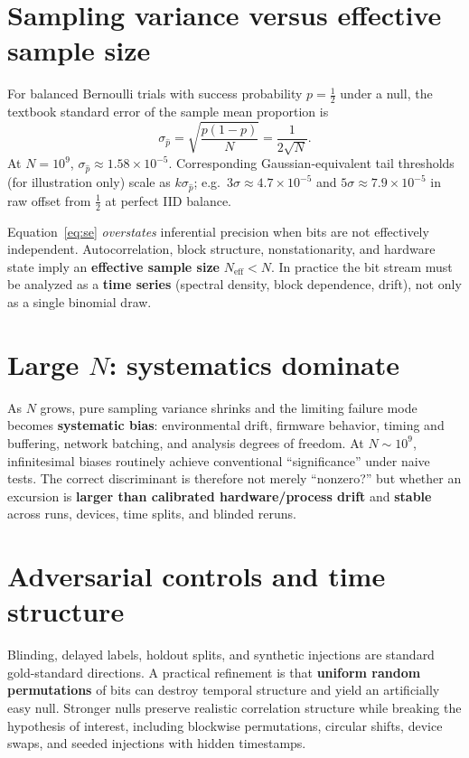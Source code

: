\documentclass[reprint,amsmath,amssymb,aps,showkeys]{revtex4-2}
\begin{document}
\section{Sampling variance versus effective sample size}
For balanced Bernoulli trials with success probability $p=\tfrac12$ under a null, the textbook standard error of the sample mean proportion is
\begin{equation}
\sigma_{\hat p} = \sqrt{\frac{p(1-p)}{N}} = \frac{1}{2\sqrt{N}}.
\label{eq:se}
\end{equation}
At $N=10^9$, $\sigma_{\hat p}\approx 1.58\times 10^{-5}$. Corresponding Gaussian-equivalent tail thresholds (for illustration only) scale as $k\sigma_{\hat p}$; e.g.\ $3\sigma\approx 4.7\times 10^{-5}$ and $5\sigma\approx 7.9\times 10^{-5}$ in raw offset from $\tfrac12$ at perfect IID balance.

Equation~\eqref{eq:se} \emph{overstates} inferential precision when bits are not effectively independent. Autocorrelation, block structure, nonstationarity, and hardware state imply an \textbf{effective sample size} $N_{\mathrm{eff}}<N$. In practice the bit stream must be analyzed as a \textbf{time series} (spectral density, block dependence, drift), not only as a single binomial draw.

\section{Large $N$: systematics dominate}
As $N$ grows, pure sampling variance shrinks and the limiting failure mode becomes \textbf{systematic bias}: environmental drift, firmware behavior, timing and buffering, network batching, and analysis degrees of freedom. At $N\sim 10^9$, infinitesimal biases routinely achieve conventional ``significance'' under naive tests. The correct discriminant is therefore not merely ``nonzero?'' but whether an excursion is \textbf{larger than calibrated hardware/process drift} and \textbf{stable} across runs, devices, time splits, and blinded reruns.

\section{Adversarial controls and time structure}
Blinding, delayed labels, holdout splits, and synthetic injections are standard gold-standard directions. A practical refinement is that \textbf{uniform random permutations} of bits can destroy temporal structure and yield an artificially easy null. Stronger nulls preserve realistic correlation structure while breaking the hypothesis of interest, including blockwise permutations, circular shifts, device swaps, and seeded injections with hidden timestamps.
\end{document}
